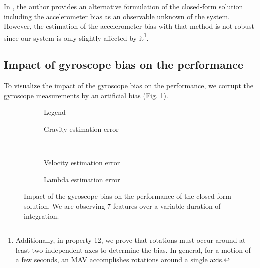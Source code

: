 \documentclass[letterpaper, 10pt, conference, final]{ieeeconf}  %
\begin{document}
In \cite{Martinelli2014}, the author provides an alternative formulation of the closed-form solution including the accelerometer bias as an observable unknown of the system.
However, the estimation of the accelerometer bias with that method is not robust since our system is only slightly affected by it\footnote{Additionally, in \cite{Martinelli2014} property 12, we prove that rotations must occur around at least two independent axes to determine the bias. In general, for a motion of a few seconds, an MAV accomplishes rotations around a single axis.}.




\subsection{Impact of gyroscope bias on the performance}
To visualize the impact of the gyroscope bias on the performance,
we corrupt the gyroscope measurements by an artificial bias (Fig. \ref{fig:biasGyroCF}).


\begin{figure}[h!]
  \centering
        \hspace{0.2\columnwidth}%
        \begin{subfigure}[b]{0.3\columnwidth}
                \resizebox{\columnwidth}{!}{}
                \caption{Legend}

        \end{subfigure}%
        \begin{subfigure}[b]{0.5\columnwidth}
                \resizebox{\columnwidth}{!}{}
                \caption{Gravity estimation error}

        \end{subfigure}
        ~
        \begin{subfigure}[b]{0.5\columnwidth}
                \resizebox{\columnwidth}{!}{}
                \caption{Velocity estimation error}

        \end{subfigure}%
        \begin{subfigure}[b]{0.5\columnwidth}
                \resizebox{\columnwidth}{!}{}
                \caption{Lambda estimation error}

        \end{subfigure}
        \caption{Impact of the gyroscope bias on the performance of the closed-form solution. We are observing 7 features over a variable duration of integration. \label{fig:biasGyroCF}}
\end{figure}
\end{document}
